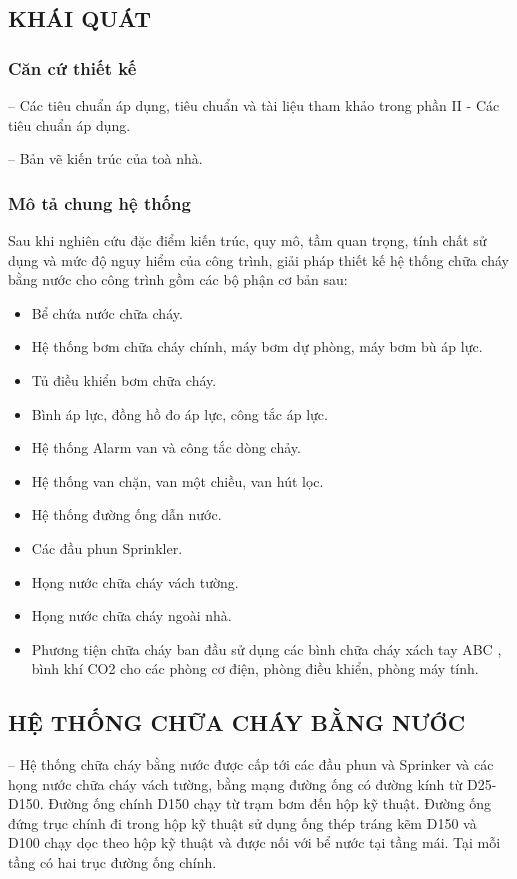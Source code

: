 \subsection{KHÁI QUÁT}
\subsubsection{Căn cứ thiết kế}
-- Các tiêu chuẩn áp dụng, tiêu chuẩn và tài liệu tham khảo trong phần II - Các tiêu chuẩn áp dụng.

-- Bản vẽ kiến trúc của toà nhà.
\subsubsection{Mô tả chung hệ thống}
Sau khi nghiên cứu đặc điểm kiến trúc, quy mô, tầm quan trọng, tính chất sử dụng và mức độ nguy hiểm của công trình, giải pháp thiết kế hệ thống chữa cháy bằng nước cho công trình gồm các bộ phận cơ bản sau:
\begin{itemize}[label={-}]
	\item Bể chứa nước chữa cháy.
	\item Hệ thống bơm chữa cháy chính, máy bơm dự phòng, máy bơm bù áp lực.
	\item Tủ điều khiển bơm chữa cháy.
	\item Bình áp lực, đồng hồ đo áp lực, công tắc áp lực.
	\item Hệ thống Alarm van và công tắc dòng chảy.
	\item Hệ thống van chặn, van một chiều, van hút lọc.
	\item Hệ thống đường ống dẫn nước.
	\item Các đầu phun Sprinkler.
	\item Họng nước chữa cháy vách tường.
	\item Họng nước chữa cháy ngoài nhà.
	\item Phương tiện chữa cháy ban đầu sử dụng các bình chữa cháy xách tay ABC , bình khí CO2 cho các phòng cơ điện, phòng điều khiển, phòng máy tính.
\end{itemize}

\subsection{HỆ THỐNG CHỮA CHÁY BẰNG NƯỚC}
-- Hệ thống chữa cháy bằng nước được cấp tới các đầu phun và Sprinker và các họng nước chữa cháy vách tường, bằng mạng đường ống có đường kính từ D25-D150. Đường ống chính D150 chạy từ trạm bơm đến hộp kỹ thuật. Đường ống đứng trục chính đi trong hộp kỹ thuật sử dụng ống thép tráng kẽm D150 và D100 chạy dọc theo hộp kỹ thuật và được nối với bể nước tại tầng mái. Tại mỗi tầng có hai trục đường ống chính.


